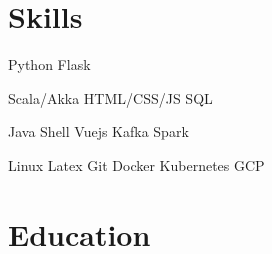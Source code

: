 \documentclass[]{plushcv}
\begin{document}
\begin{minipage}[t]{0.70\textwidth}
%
%

\end{minipage}
\hfill
\begin{minipage}[t]{0.25\textwidth}


\section{Skills}
\sectionsep
{}
Python \textbullet{} Flask  \\
\sectionsep

Scala/Akka \textbullet{} HTML/CSS/JS \textbullet SQL  \\
\sectionsep

Java \textbullet{}  Shell \textbullet{} Vuejs \textbullet{} Kafka \textbullet{} Spark \\
\sectionsep

\sectionsep
Linux \textbullet{} Latex \textbullet{} Git \textbullet{} Docker \textbullet{} Kubernetes \textbullet{} GCP \\

\sectionsep


\section{Education}

\end{minipage}
\end{document}
